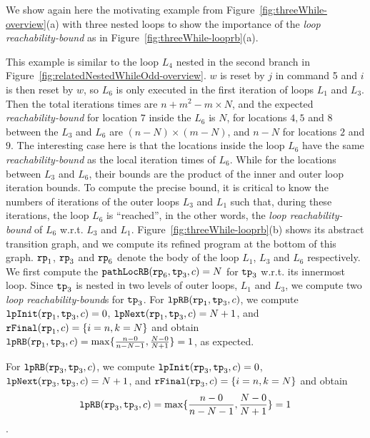 We show again here the motivating example from
Figure~\ref{fig:threeWhile-overview}(a) with three nested loops to show the importance of the \emph{loop reachability-bound} as in Figure~\ref{fig:threeWhile-looprb}(a).

This example is similar to the loop $L_4$ nested in the second branch in Figure~\ref{fig:relatedNestedWhileOdd-overview}.
$w$ is reset by $j$ in command 5 and $i$ is then reset by $w$, so $L_6$ is only executed in the first iteration of loops $L_1$ and $L_3$.
Then the total iterations times are
$n + m^2 - m \times N$,
and the expected \emph{reachability-bound} for location $7$ inside the $L_6$ is $N$,
for locations $4, 5$ and $8$ between the $L_3$ and $L_6$ are $(n-N) \times (m - N)$,
and $n - N$ for locations $2$ and $9$.
The interesting case here is that the locations inside the loop $L_6$ have the same
\emph{reachability-bound} as the local iteration times of $L_6$.
While for the locations between $L_3$ and $L_6$, their bounds are the product of the inner and outer loop iteration bounds.
To compute the precise bound, it is critical to know
the numbers of iterations of the outer loops $L_3$ and $L_1$ such that,
during these iterations, the loop $L_6$ is ``reached'', in the other words, the \emph{loop reachability-bound}
of $L_6$ w.r.t. $L_3$ and $L_1$.
Figure~\ref{fig:threeWhile-looprb}(b) shows its abstract transition graph,
and we compute its refined program at the bottom of this graph. 
$\mathtt{rp}_1$, $\mathtt{rp}_3$ and $\mathtt{rp}_6$ denote the body of the loop $L_1$, $L_3$ and $L_6$ respectively.
We first compute the $\mathtt{pathLocRB}(\mathtt{rp}_6, \mathtt{tp}_3, c) = N $ for $\mathtt{tp}_3$ w.r.t. its innermost loop.
Since $\mathtt{tp}_3$ is nested in two levels of outer loops, $L_1$ and $L_3$,
we compute two \emph{loop reachability-bound}s for $\mathtt{tp}_3$.
For $\mathtt{lpRB}(\mathtt{rp}_1, \mathtt{tp}_3, c)$,
we compute $\mathtt{lpInit}( \mathtt{rp}_1, \mathtt{tp}_3, c) = 0$,
$\mathtt{lpNext}( \mathtt{rp}_1, \mathtt{tp}_3, c) = N + 1 $, and
$\mathtt{rFinal}(\mathtt{rp}_1, c) = \{ i = n, k = N \}$ and obtain
$\mathtt{lpRB}(\mathtt{rp}_1, \mathtt{tp}_3, c) = \max\{ \frac{n - 0}{n - N - 1}, \frac{N - 0}{N + 1}\} = 1$, as expected.

For $\mathtt{lpRB}(\mathtt{rp}_3, \mathtt{tp}_3, c)$,
we compute $\mathtt{lpInit}( \mathtt{rp}_3, \mathtt{tp}_3, c) = 0$,
$\mathtt{lpNext}( \mathtt{rp}_3, \mathtt{tp}_3, c) = N + 1 $, and
$\mathtt{rFinal}(\mathtt{rp}_3, c) = \{ i = n, k = N \}$ and obtain
$$\mathtt{lpRB}(\mathtt{rp}_3, \mathtt{tp}_3, c) = \max\{ \frac{n - 0}{n - N - 1}, \frac{N - 0}{N + 1}\} = 1$$.

